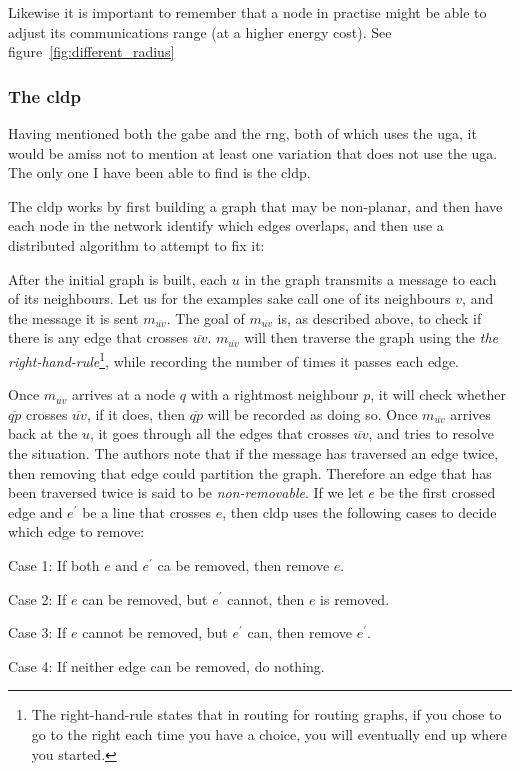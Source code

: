 Likewise it is important to remember that a node in practise might be able to adjust its communications range (at a higher energy cost). See figure~\ref{fig:different_radius}

\subsubsection{The \ac{cldp}}
Having mentioned both the \ac{gabe} and the \ac{rng}, both of which uses the \ac{uga}, it would be amiss not to mention at least one variation that does not use the \ac{uga}. The only one I have been able to find is the \ac{cldp}.
 
The \ac{cldp} works by first building a graph that may be non-planar, and then have each node in the network identify which edges overlaps, and then use a distributed algorithm to attempt to fix it:

After the initial graph is built, each $u$ in the graph transmits a message to each of its neighbours. Let us for the examples sake call one of its neighbours $v$, and the message it is sent $m_{\overline{uv}}$. The goal of $m_{\overline{uv}}$ is, as described above, to check if there is any edge that crosses $\overline{uv}$. $m_{\overline{uv}}$ will then traverse the graph using the \label{right-hand-rule} \emph{the right-hand-rule}\footnote{The right-hand-rule states that in routing for routing graphs, if you chose to go to the right each time you have a choice, you will eventually end up where you started.}, while recording the number of times it passes each edge.

Once $m_{\overline{uv}}$ arrives at a node $q$ with a rightmost neighbour $p$, it will check whether $\overline{qp}$ crosses $\overline{uv}$, if it does, then $\overline{qp}$ will be recorded as doing so. Once $m_{\overline{uv}}$ arrives back at the $u$, it goes through all the edges that crosses $\overline{uv}$, and tries to resolve the situation. The authors note that if the message has traversed an edge twice, then removing that edge could partition the graph. Therefore an edge that has been traversed twice is said to be \emph{non-removable}. If we let $e$ be the first crossed edge and $e^{\prime}$ be a line that crosses $e$, then \ac{cldp} uses the following cases to decide which edge to remove:
\begin{description}
\item{Case 1:} If both $e$ and $e^{\prime}$ ca be removed, then remove $e$.
\item{Case 2:} If $e$ can be removed, but $e^{\prime}$ cannot, then $e$ is removed.
\item{Case 3:} If $e$ cannot be removed, but $e^{\prime}$ can, then remove $e^{\prime}$.
\item{Case 4:} If neither edge can be removed, do nothing. 
\end{description}

